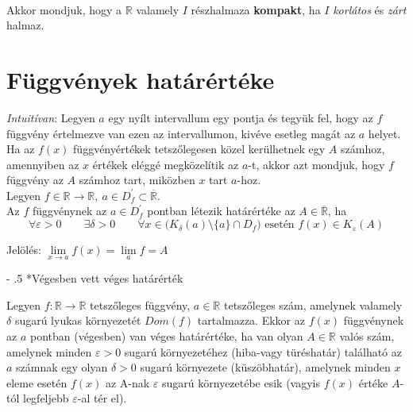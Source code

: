 \documentclass[tikz,12pt,margin=0px]{article}
\makeatletter
\renewcommand\paragraph{%
	\@startsection{paragraph}{4}{0mm}%
	{-\baselineskip}%
	{.5\baselineskip}%
	{\normalfont\normalsize\bfseries}}
\makeatother
\begin{document}
    \noindent {\footnotesize $\triangleleft$ \faLightbulbO }\\

    \noindent Akkor mondjuk, hogy a $\mathbb{R}$ valamely $I$ részhalmaza \textbf{kompakt}, ha $I$ \emph{korlátos} és \emph{zárt} halmaz.\\

	\section*{Függvények határértéke}
	
    \textit{Intuitívan}: Legyen $a$ egy nyílt intervallum egy pontja és tegyük fel, hogy az $f$ függvény értelmezve van ezen az intervallumon, kivéve esetleg magát az $a$ helyet.\\
     Ha az $f(x)$ függvényértékek tetszőlegesen közel kerülhetnek egy $A$ számhoz, amennyiben az $x$ értékek eléggé megközelítik az $a$-t, akkor azt mondjuk, hogy $f$ függvény az $A$ számhoz tart, miközben $x$ tart $a$-hoz.\\

    \noindent Legyen $f \in \mathbb{R} \rightarrow \mathbb{R},\ a \in D_{f}^{'} \subset \overline{\mathbb{R}}$.\\
    Az $f$ függvénynek az $a \in D_{f}^{'}$ pontban létezik határértéke az $A \in \overline{\mathbb{R}}$, ha
    \[
        \forall \varepsilon > 0\qquad \exists \delta > 0\qquad \forall x \in \Big(K_{\delta}(a)\setminus\{a\} \cap D_{f} \Big)\text{ esetén }f(x) \in K_{\varepsilon}(A)
    \]

    \begin{center}
        Jelölés: $\lim\limits_{x \to a}{f(x)} = \lim\limits_{a}{f} = A$
    \end{center}

    \paragraph*{Végesben vett véges határérték\\}

    {\footnotesize \noindent {\color{blue} \faLightbulbO\ $\triangleright$ } }

    {\footnotesize

    \noindent Legyen $f : \mathbb{R} \rightarrow \mathbb{R}$ tetszőleges függvény, $a \in \mathbb{R}$ tetszőleges szám, amelynek valamely $\delta$ sugarú lyukas környezetét $Dom(f)$ tartalmazza.  Ekkor az $f(x)$ függvénynek az $a$ pontban (végesben) van véges határértéke, ha van olyan $A \in \mathbb{R}$ valós szám, amelynek minden $\varepsilon > 0$ sugarú környezetéhez (hiba-vagy türéshatár) található az $a$ számnak egy olyan $\delta > 0$ sugarú környezete (küszöbhatár), amelynek minden $x$ eleme esetén $f(x)$ az A-nak $\varepsilon$ sugarú környezetébe esik (vagyis $f(x)$ értéke $A$-tól legfeljebb $\varepsilon$-al tér el).\\
    }
    \noindent {\footnotesize $\triangleleft$ \faLightbulbO }\\
\end{document}
